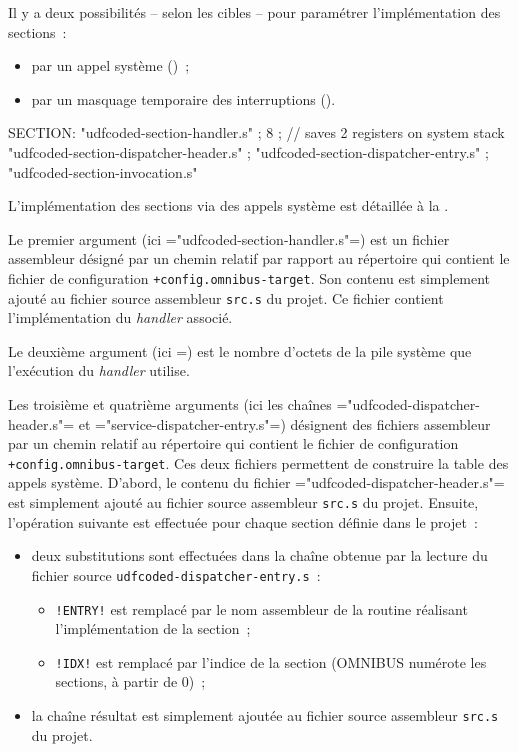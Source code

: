 
Il y a deux possibilités -- selon les cibles -- pour paramétrer l'implémentation des sections~:
\begin{itemize}
  \item par un appel système ()~;
  \item par un masquage temporaire des interruptions ().
\end{itemize}


\begin{OMNIBUS}
SECTION:
  "udfcoded-section-handler.s" ;
  8 ; // saves 2 registers on system stack
  "udfcoded-section-dispatcher-header.s" ;
  "udfcoded-section-dispatcher-entry.s" ;
  "udfcoded-section-invocation.s"
\end{OMNIBUS}

L'implémentation des sections via des appels système est détaillée à la .

Le premier argument (ici \omnibus="udfcoded-section-handler.s"=) est un fichier assembleur désigné par un chemin relatif par rapport au répertoire qui contient le fichier de configuration \texttt{+config.omnibus-target}. Son contenu est simplement ajouté au fichier source assembleur \texttt{src.s} du projet. Ce fichier contient l'implémentation du \emph{handler} associé.

Le deuxième argument (ici =) est le nombre d'octets de la pile système que l'exécution du \emph{handler} utilise.

Les troisième et quatrième arguments (ici les chaînes \omnibus="udfcoded-dispatcher-header.s"= et \omnibus="service-dispatcher-entry.s"=) désignent des fichiers assembleur par un chemin relatif au répertoire qui contient le fichier de configuration \texttt{+config.omnibus-target}. Ces deux fichiers permettent de construire la table des appels système. D'abord, le contenu du fichier \omnibus="udfcoded-dispatcher-header.s"= est simplement ajouté au fichier source assembleur \texttt{src.s} du projet. Ensuite, l'opération suivante est effectuée pour chaque section définie dans le projet~:
\begin{itemize}
  \item deux substitutions sont effectuées dans la chaîne obtenue par la lecture du fichier source \texttt{udfcoded-dispatcher-entry.s}~:
  \begin{itemize}
    \item \texttt{!ENTRY!} est remplacé par le nom assembleur de la routine réalisant l'implémentation de la section~;
    \item \texttt{!IDX!} est remplacé par l'indice de la section (OMNIBUS numérote les sections, à partir de $0$)~;
  \end{itemize}
  \item la chaîne résultat est simplement ajoutée au fichier source assembleur \texttt{src.s} du projet.
\end{itemize}

